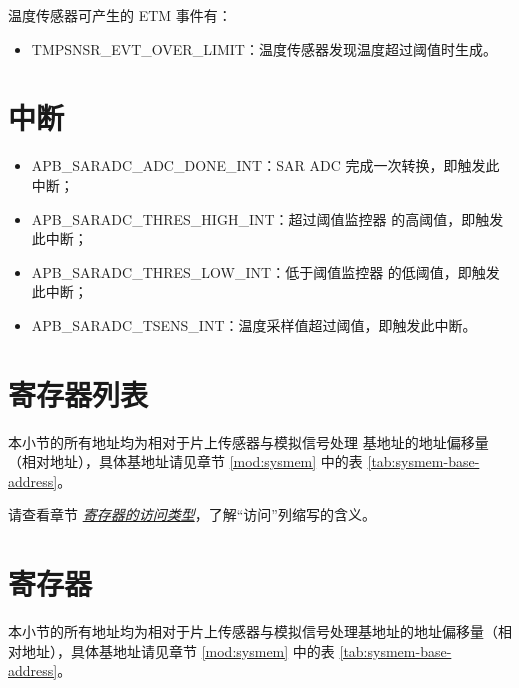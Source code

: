 \documentclass[main\_\_CN.tex]{subfiles}
\begin{document}
温度传感器可产生的 ETM 事件有：

\begin{itemize}
    \item TMPSNSR\_EVT\_OVER\_LIMIT：温度传感器发现温度超过阈值时生成。
\end{itemize}


\section{中断}

\begin{itemize}
   \item \label{int:SARADCDONEINT1} APB\_SARADC\_ADC\_DONE\_INT：SAR ADC 完成一次转换，即触发此中断；
   \item \label{int:APBSARADCTHRESxHIGHINT} APB\_SARADC\_THRES\_HIGH\_INT：超过阈值监控器  的高阈值，即触发此中断；
   \item \label{int:APBSARADCTHRESxLOWINT} APB\_SARADC\_THRES\_LOW\_INT：低于阈值监控器  的低阈值，即触发此中断；
   \item \label{int:APBSARADCTSENSINT} APB\_SARADC\_TSENS\_INT：温度采样值超过阈值，即触发此中断。
\end{itemize}




\clearpage
\hypertarget{sensor-reg-summ}{}
\section{寄存器列表}
\label{sec:sensor-reg-summ}

本小节的所有地址均为相对于片上传感器与模拟信号处理 基地址的地址偏移量（相对地址），具体基地址请见章节 \ref{mod:sysmem} \textit{} 中的表 \ref{tab:sysmem-base-address}。

请查看章节 \hyperref[glossary-access-types]{\textit{寄存器的访问类型}}，了解“访问”列缩写的含义。







\clearpage
\section{寄存器}

本小节的所有地址均为相对于片上传感器与模拟信号处理基地址的地址偏移量（相对地址），具体基地址请见章节 \ref{mod:sysmem} \textit{} 中的表 \ref{tab:sysmem-base-address}。


\end{document}
